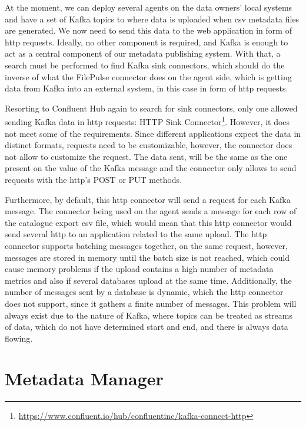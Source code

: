 At the moment, we can deploy several agents on the data owners' local systems and have a set of Kafka topics to where data is uploaded when \gls{csv} metadata files are generated.
We now need to send this data to the web application in form of \gls{http} requests.
Ideally, no other component is required, and Kafka is enough to act as a central component of our metadata publishing system.
With that, a search must be performed to find Kafka sink connectors, which should do the inverse of what the FilePulse connector does on the agent side, which is getting data from Kafka into an external system, in this case in form of \gls{http} requests.

Resorting to Confluent Hub again to search for sink connectors, only one allowed sending Kafka data in \gls{http} requests: HTTP Sink Connector\footnote{\url{https://www.confluent.io/hub/confluentinc/kafka-connect-http}}.
However, it does not meet some of the requirements.
Since different applications expect the data in distinct formats, requests need to be customizable, however, the connector does not allow to customize the request.
The data sent, will be the same as the one present on the value of the Kafka message and the connector only allows to send requests with the \gls{http}'s POST or PUT methods.

Furthermore, by default, this \gls{http} connector will send a request for each Kafka message.
The connector being used on the agent sends a message for each row of the catalogue export \gls{csv} file, which would mean that this \gls{http} connector would send several \gls{http} to an application related to the same upload.
The \gls{http} connector supports batching messages together, on the same request, however, messages are stored in memory until the batch size is not reached, which could cause memory problems if the upload contains a high number of metadata metrics and also if several databases upload at the same time.
Additionally, the number of messages sent by a database is dynamic, which the \gls{http} connector does not support, since it gathers a finite number of messages.
This problem will always exist due to the nature of Kafka, where topics can be treated as streams of data, which do not have determined start and end, and there is always data flowing.

\section{Metadata Manager}

